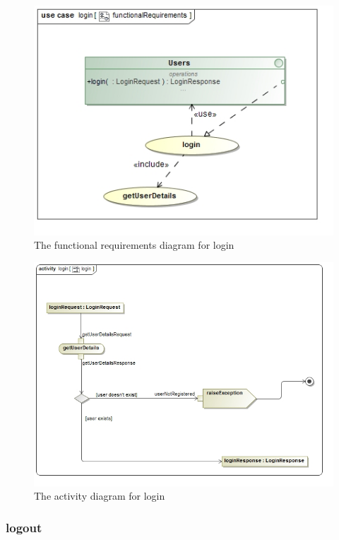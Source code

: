\begin{figure}[H]
	\centering
	\includegraphics[width=1.0\textwidth]{../images/funcReq/loginFunctionalRequirements.jpg}
	\caption{The functional requirements diagram for login \label{overflow}}
\end{figure}

\begin{figure}[H]
	\centering
	\includegraphics[width=1.0\textwidth]{../images/funcReq/loginActivityDiagram.jpg}
	\caption{The activity diagram for login \label{overflow}}
\end{figure}

\subsubsection{logout}

